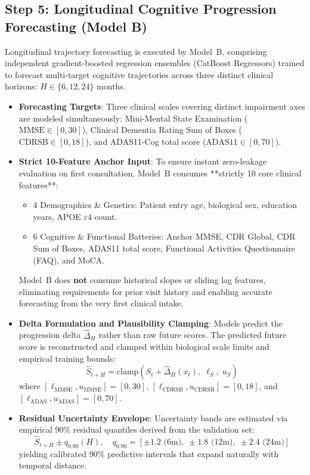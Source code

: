 \documentclass[11pt,a4paper]{article}
\begin{document}
\subsection{Step 5: Longitudinal Cognitive Progression Forecasting (Model B)}
\label{sec:method_forecasting}
Longitudinal trajectory forecasting is executed by Model~B, comprising independent gradient-boosted regression ensembles (CatBoost Regressors) trained to forecast multi-target cognitive trajectories across three distinct clinical horizons: $H \in \{6, 12, 24\}$ months.
\begin{itemize}
    \item \textbf{Forecasting Targets}: Three clinical scales covering distinct impairment axes are modeled simultaneously: Mini-Mental State Examination ($\text{MMSE} \in [0, 30]$), Clinical Dementia Rating Sum of Boxes ($\text{CDRSB} \in [0, 18]$), and ADAS11-Cog total score ($\text{ADAS11} \in [0, 70]$).
    \item \textbf{Strict 10-Feature Anchor Input}: To ensure instant zero-leakage evaluation on first consultation, Model~B consumes **strictly 10 core clinical features**:
    \begin{itemize}
        \item 4 Demographics \& Genetics: Patient entry age, biological sex, education years, APOE $\varepsilon4$ count.
        \item 6 Cognitive \& Functional Batteries: Anchor MMSE, CDR Global, CDR Sum of Boxes, ADAS11 total score, Functional Activities Questionnaire (FAQ), and MoCA.
    \end{itemize}
    Model~B does \textbf{not} consume historical slopes or sliding lag features, eliminating requirements for prior visit history and enabling accurate forecasting from the very first clinical intake.
    \item \textbf{Delta Formulation and Plausibility Clamping}: Models predict the progression delta $\hat{\Delta}_H$ rather than raw future scores. The predicted future score is reconstructed and clamped within biological scale limits and empirical training bounds:
    \begin{equation}
        \hat{S}_{t+H} = \text{clamp}\left(S_t + \hat{\Delta}_H(x_t), \; \ell_S, \; u_S\right)
        \label{eq:score_clamp}
    \end{equation}
    where $[\ell_{\text{MMSE}}, u_{\text{MMSE}}] = [0, 30]$, $[\ell_{\text{CDRSB}}, u_{\text{CDRSB}}] = [0, 18]$, and $[\ell_{\text{ADAS}}, u_{\text{ADAS}}] = [0, 70]$.
    \item \textbf{Residual Uncertainty Envelope}: Uncertainty bands are estimated via empirical 90\% residual quantiles derived from the validation set:
    \begin{equation}
        \hat{S}_{t+H} \pm q_{0.90}(H), \quad q_{0.90} = [\pm 1.2 \text{ (6m)}, \; \pm 1.8 \text{ (12m)}, \; \pm 2.4 \text{ (24m)}]
        \label{eq:uncertainty_band}
    \end{equation}
    yielding calibrated 90\% predictive intervals that expand naturally with temporal distance.
\end{itemize}
\end{document}
